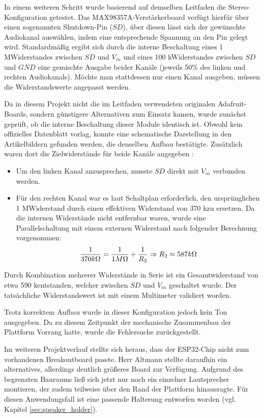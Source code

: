In einem weiteren Schritt wurde basierend auf demselben Leitfaden die Stereo-Konfiguration getestet. 
Das MAX98357A-Verstärkerboard verfügt hierfür über einen sogenannten Shutdown-Pin ($SD$), über diesen lässt sich der gewünschte Audiokanal auswählen, indem eine entsprechende Spannung an den Pin gelegt wird.
Standardmäßig ergibt sich durch die interne Beschaltung eines 1 M\textOmega \space Widerstandes zwischen $SD$ und $V_{in}$ und eines 100 k\textOmega \space Widerstandes zwischen $SD$ und $GND$ eine gemischte Ausgabe beider Kanäle (jeweils 50\% des linken und rechten Audiokanals). 
Möchte man stattdessen nur einen Kanal ausgeben, müssen die Widerstandswerte angepasst werden.

Da in diesem Projekt nicht die im Leitfaden verwendeten originalen Adafruit-Boards, sondern günstigere Alternativen zum Einsatz kamen, wurde zunächst geprüft, ob die interne Beschaltung dieser Module identisch ist. 
Obwohl kein offizielles Datenblatt vorlag, konnte eine schematische Darstellung in den Artikelbildern gefunden werden, die denselben Aufbau bestätigte. 
Zusätzlich waren dort die Zielwiderstände für beide Kanäle angegeben \cite{raspberry_max98357}:

\begin{itemize}
    \item Um den linken Kanal anzusprechen, musste $SD$ direkt mit $V_{in}$ verbunden werden.
    \item Für den rechten Kanal war es laut Schaltplan erforderlich, den ursprünglichen 1 M\textOmega \space Widerstand durch einen effektiven Widerstand von 370 k\textOmega \space zu ersetzen. 
    Da die internen Widerstände nicht entfernbar waren, wurde eine Parallelschaltung mit einem externen Widerstand nach folgender Berechnung vorgenommen:
    \[
    \frac{1}{370 k\Omega} = \frac{1}{1 M\Omega} + \frac{1}{R_2} \space\Rightarrow\space
    R_2 \approx 587 k\Omega 
    \]
\end{itemize}

Durch Kombination mehrerer Widerstände in Serie ist ein Gesamtwiderstand von etwa 590 k\textOmega \space entstanden, welcher zwischen $SD$ und $V_{in}$ geschaltet wurde. 
Der tatsächliche Widerstandswert ist mit einem Multimeter validiert worden.

Trotz korrektem Aufbau wurde in dieser Konfiguration jedoch kein Ton ausgegeben. 
Da zu diesem Zeitpunkt der mechanische Zusammenbau der Plattform Vorrang hatte, wurde die Fehlersuche zurückgestellt.

Im weiteren Projektverlauf stellte sich heraus, dass der ESP32-Chip nicht zum vorhandenen Breakoutboard passte. 
Herr Altmann stellte daraufhin ein alternatives, allerdings deutlich größeres Board zur Verfügung. 
Aufgrund des begrenzten Bauraums ließ sich jetzt nur noch ein einzelner Lautsprecher montieren, der zudem teilweise über den Rand der Plattform hinausragte. 
Für diesen Anwendungsfall ist eine passende Halterung entworfen worden (vgl. Kapitel \ref{sec:speaker_holder}).

